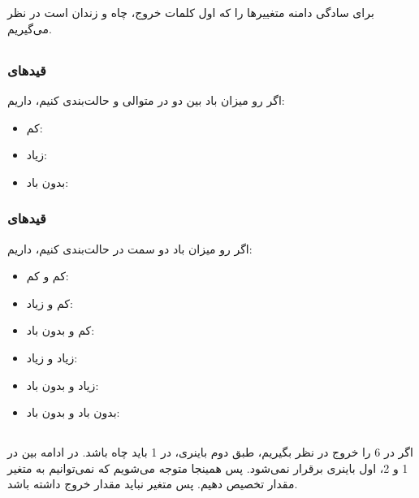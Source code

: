 \documentclass{university}
\begin{document}
\setupdocument

\section{}
برای سادگی دامنه متغییرها را 
که اول کلمات خروج، چاه و زندان است در نظر می‌گیریم.

\subsection{}
\subsubsection{قیدهای }
اگر رو میزان باد بین دو در متوالی
و
حالت‌بندی کنیم، داریم:
\begin{itemize}
    \item کم: 
    \item زیاد: 
    \item بدون باد: 
\end{itemize}

\subsubsection{قیدهای }
اگر رو میزان باد دو سمت در 
حالت‌بندی کنیم، داریم:
\begin{itemize}
    \item کم و کم: 
    \item کم و زیاد: 
    \item کم و بدون باد: 
    \item زیاد و زیاد: 
    \item زیاد و بدون باد: 
    \item بدون باد و بدون باد: 
\end{itemize}

\subsection{}
اگر در 6 را خروج در نظر بگیریم، طبق 
دوم باینری، در 1 باید چاه باشد. در ادامه بین در 1 و 2، 
اول باینری برقرار نمی‌شود. پس همینجا متوجه می‌شویم که نمی‌توانیم به متغیر 
مقدار تخصیص دهیم. پس متغیر 
نباید مقدار خروج داشته باشد.
\end{document}
